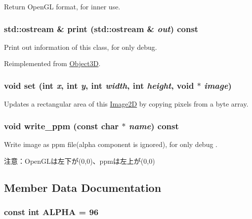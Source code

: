 Return OpenGL format, for inner use. \hypertarget{classm3g_1_1Image2D_6fea17fa1532df3794f8cb39cb4f911f}{
\subsubsection[{print}]{\setlength{\rightskip}{0pt plus 5cm}std::ostream \& print (std::ostream \& {\em out}) const}}
\label{classm3g_1_1Image2D_6fea17fa1532df3794f8cb39cb4f911f}


Print out information of this class, for only debug. 

Reimplemented from \hyperlink{classm3g_1_1Object3D_6fea17fa1532df3794f8cb39cb4f911f}{Object3D}.\hypertarget{classm3g_1_1Image2D_fe9ef1abefb9e92b38687e27c9004bdc}{
\subsubsection[{set}]{\setlength{\rightskip}{0pt plus 5cm}void set (int {\em x}, \/  int {\em y}, \/  int {\em width}, \/  int {\em height}, \/  void $\ast$ {\em image})}}
\label{classm3g_1_1Image2D_fe9ef1abefb9e92b38687e27c9004bdc}


Updates a rectangular area of this \hyperlink{classm3g_1_1Image2D}{Image2D} by copying pixels from a byte array. \hypertarget{classm3g_1_1Image2D_6ec48e0681b8805c75ecadf4ba4a40cb}{
\subsubsection[{write\_\-ppm}]{\setlength{\rightskip}{0pt plus 5cm}void write\_\-ppm (const char $\ast$ {\em name}) const}}
\label{classm3g_1_1Image2D_6ec48e0681b8805c75ecadf4ba4a40cb}


Write image as ppm file(alpha component is ignored), for only debug .

注意：OpenGLは左下が(0,0)、ppmは左上が(0,0) 

\subsection{Member Data Documentation}
\hypertarget{classm3g_1_1Image2D_417581fcde4067111f47320edb2aa378}{
\subsubsection[{ALPHA}]{\setlength{\rightskip}{0pt plus 5cm}const int {\bf ALPHA} = 96}}
\label{classm3g_1_1Image2D_417581fcde4067111f47320edb2aa378}


